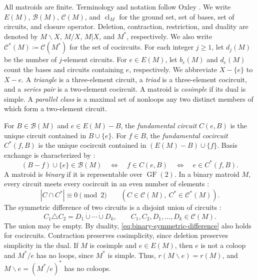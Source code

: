 \documentclass[11pt]{article}
\numberwithin{equation}{section}
\DeclareMathOperator{\GF}{GF}
\DeclareMathOperator{\cl}{cl}
\newcommand{\BB}{\mathcal B}
\newcommand{\CC}{\mathcal C}
\newcommand{\FF}{\GF(2)}
\begin{document}
All matroids are finite. Terminology and notation follow
Oxley \cite{Oxley2011}.
We write \(E(M)\), \(\BB(M)\), \(\CC(M)\), and \(\cl_M\) for
the ground set, set of bases, set of circuits, and closure operator.
Deletion, contraction, restriction, and duality are denoted by
\(M\backslash X\), \(M/X\), \(M|X\), and \(M^*\), respectively.
We also write \(\CC^*(M)\coloneqq\CC(M^*)\) for the set of cocircuits.
For each integer \(j\ge1\), let \(d_j(M)\) be the number of \(j\)-element
circuits. For \(e\in E(M)\), let \(b_e(M)\) and \(d_e(M)\)
count the bases and circuits containing \(e\), respectively. We abbreviate
\(X-\{e\}\) to \(X-e\). A \emph{triangle} is a three-element circuit,
a \emph{triad} is a three-element cocircuit, and a \emph{series pair} is a
two-element cocircuit. A matroid is \emph{cosimple} if its dual is simple.
A \emph{parallel class} is a maximal set of nonloops any two
distinct members of which form a two-element circuit.

For \(B\in\BB(M)\) and \(e\in E(M)-B\), the
\emph{fundamental circuit} \(C(e,B)\) is the unique circuit
contained in \(B\cup\{e\}\). For \(f\in B\), the
\emph{fundamental cocircuit} \(C^*(f,B)\) is the unique cocircuit
contained in \((E(M)-B)\cup\{f\}\).
Basis exchange is characterized by
\cite[Section~1.2, Exercise~5 and Section~2.1, Exercise~10(b)]{Oxley2011}:
\begin{equation}\label{eq:exchange}
 (B-f)\cup\{e\}\in\BB(M)
 \quad\Longleftrightarrow\quad f\in C(e,B)
 \quad\Longleftrightarrow\quad e\in C^*(f,B).
\end{equation}
A matroid is \emph{binary} if it is representable over \(\FF\).
In a binary matroid \(M\), every circuit meets every cocircuit in an
even number of elements \cite[Theorem~9.1.2(ii)]{Oxley2011}:
\begin{equation}\label{eq:binary-orthogonality}
 |C\cap C^*|\equiv0\pmod2
 \qquad(C\in\CC(M),\ C^*\in\CC^*(M)).
\end{equation}
The symmetric difference of two circuits is a disjoint union
of circuits \cite[Theorem~9.1.2(iv)]{Oxley2011}:
\begin{equation}\label{eq:binary-symmetric-difference}
 C_1\triangle C_2=D_1\mathbin{\dot\cup}\cdots\mathbin{\dot\cup}D_k,
 \qquad C_1,C_2,D_1,\ldots,D_k\in\CC(M).
\end{equation}
The union may be empty. By duality,
\eqref{eq:binary-symmetric-difference} also holds for cocircuits.
Contraction preserves cosimplicity, since deletion preserves
simplicity in the dual. If \(M\) is cosimple and \(e\in E(M)\), then
\(e\) is not a coloop and \(M^*/e\) has no loops, since \(M^*\) is simple.
Thus, \(r(M\backslash e)=r(M)\), and
\(M\backslash e=(M^*/e)^*\) has no coloops.
\end{document}
